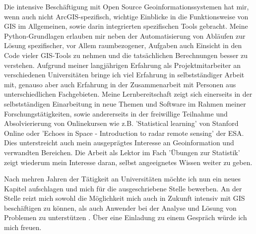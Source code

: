 \documentclass[11pt,a4paper,sans]{moderncv}        %
\begin{document}
Die intensive Besch\"aftigung mit Open Source Geoinformationssystemen hat mir, wenn auch nicht ArcGIS-spezifisch, wichtige Einblicke in die Funktionsweise von GIS im Allgemeinen, sowie darin integrierten  spezifischen Tools gebracht. Meine Python-Grundlagen erlauben mir neben der Automatisierung von Abl\"aufen zur L\"osung spezifischer, vor Allem raumbezogener, Aufgaben auch Einsicht in den Code vieler GIS-Tools zu nehmen und die tats\"achlichen Berechnungen besser zu verstehen. Aufgrund meiner langj\"{a}hrigen Erfahrung als Projektmitarbeiter an verschiedenen Universit\"{a}ten bringe ich viel Erfahrung in selbstst\"{a}ndiger Arbeit mit, genauso aber auch Erfahrung in der Zusammenarbeit mit Personen aus unterschiedlichen Fachgebieten. Meine Lernbereitschaft zeigt sich einerseits in der selbstst\"andigen Einarbeitung in neue Themen und Software im Rahmen meiner Forschungst\"atigkeiten, sowie andererseits in der freiwillige Teilnahme und  Absolvierierung von Onlinekursen wie z.B. 'Statistical learning' von Stanford Online oder 'Echoes in Space - Introduction to radar remote sensing' der ESA. Dies unterstreicht auch mein ausgepr\"agtes Interesse an Geoinformation und verwandten Bereichen. Die Arbeit als Lektor im Fach '\"Ubungen zur Statistik' zeigt wiederum mein Interesse daran, selbst angeeignetes Wissen weiter zu geben.

Nach mehren Jahren der T\"atigkeit an Universit\"aten m\"ochte ich nun ein neues Kapitel aufschlagen und mich f\"ur die ausgeschriebene Stelle bewerben. An der Stelle reizt mich sowohl die M\"oglichkeit mich auch in Zukunft intensiv mit GIS besch\"aftigen zu k\"onnen, als auch  Anwender bei der Analyse und L\"osung von Problemen zu unterst\"utzen . \"Uber eine Einladung zu einem Gespr\"ach w\"urde ich mich freuen.

\makeletterclosing
\clearpage
\makecvtitle
\end{document}
